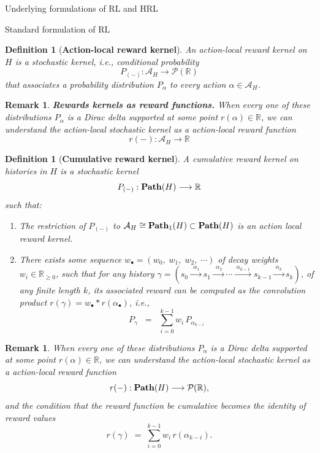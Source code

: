 \documentclass[11pt]{article}
\newtheorem{definition}[subsubsection]{Definition}
\newtheorem{remark}[subsubsection]{Remark}
\begin{document}
\begin{section}{Underlying formulations of RL and HRL}
\begin{subsection}{Standard formulation of RL}
\begin{definition}[{\bf Action-local reward kernel}]
An {\em action-local reward kernel} on $H$ is a stochastic kernel, i.e., conditional probability
$$
P_{(-)}:\mathcal{A}_{H}\longrightarrow \mathcal{P}(\mathbb{R})
$$
that associates a probability distribution $P_{\alpha}$ to every action $\alpha\in\mathcal{A}_{H}$.
\end{definition}

\begin{remark}
{\bf Rewards kernels as reward functions.}
\normalfont
When every one of these distributions $P_{\!\alpha}$ is a Dirac delta supported at some point $r(\alpha)\in\mathbb{R}$, we can understand the action-local stochastic kernel as a {\em action-local reward function}
$$
r(-):\mathcal{A}_{H}\longrightarrow\mathbb{R}
$$
\end{remark}

\begin{definition}[{\bf Cumulative reward kernel}]
A {\em cumulative reward kernel} on histories in $H$ is a stochastic kernel
$$
P_{(-)}:\bold{Path}(H)\longrightarrow \mathbb{R}
$$
such that:
\begin{enumerate}
\item
The restriction of $P_{(-)}$ to $\mathcal{A}_{H}\cong\bold{Path}_{1}(H)\subset\bold{Path}(H)$ is an action local reward kernel.
\item
There exists some sequence $w_{\bullet}=(w_{0}, \;w_{1},\;w_{2},\;\cdots)$ of {\em decay weights} $w_{i}\in\mathbb{R}_{\ge0}$, such that for any history $\gamma=(s_{0}\xrightarrow{\ \ \alpha_{1}\ }s_{1}\xrightarrow{\ \ \alpha_{2}\ }\cdots\xrightarrow{\ \alpha_{k-1}\ }s_{k-1}\xrightarrow{\ \alpha_{k}\ }s_{k})$, of any finite length $k$, its associated reward can be computed as the convolution product $r(\gamma)=w_{\bullet}\ast r(\alpha_{\bullet})$, i.e.,
$$
    P_{\gamma}\;\;=\;\;\sum_{i=0}^{k-1} w_{i}\,P_{\alpha_{k-i}}
$$
\end{enumerate}
\end{definition}

\begin{remark}
\normalfont
When every one of these distributions $P_{\!\alpha}$ is a Dirac delta supported at some point $r(\alpha)\in\mathbb{R}$, we can understand the action-local stochastic kernel as a {\em action-local reward function}
$$
r(-):\bold{Path}(H)\longrightarrow\mathcal{P}(\mathbb{R}),
$$
and the condition that the reward function be cumulative becomes the identity of reward values
$$
    r(\gamma)\;=\;\sum_{i=0}^{k-1} w_{i}\,r(\alpha_{k-i}).
$$
\end{remark}


\end{subsection}
\end{section}
\end{document}
